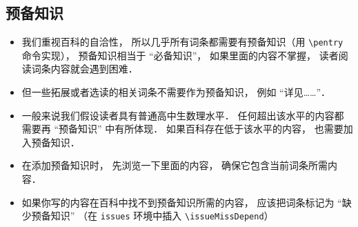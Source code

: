 
\subsection{预备知识}
\begin{itemize}
\item 我们重视百科的自洽性， 所以几乎所有词条都需要有预备知识（用 \verb|\pentry| 命令实现）， 预备知识相当于 “必备知识”， 如果里面的内容不掌握， 读者阅读词条内容就会遇到困难．
\item 但一些拓展或者选读的相关词条不需要作为预备知识， 例如 “详见……”．
\item 一般来说我们假设读者具有普通高中生数理水平． 任何超出该水平的内容都需要再 “预备知识” 中有所体现． 如果百科存在低于该水平的内容， 也需要加入预备知识．
\item 在添加预备知识时， 先浏览一下里面的内容， 确保它包含当前词条所需内容．
\item 如果你写的内容在百科中找不到预备知识所需的内容， 应该把词条标记为 “缺少预备知识” （在 \verb|issues| 环境中插入 \verb|\issueMissDepend|）
\end{itemize}

